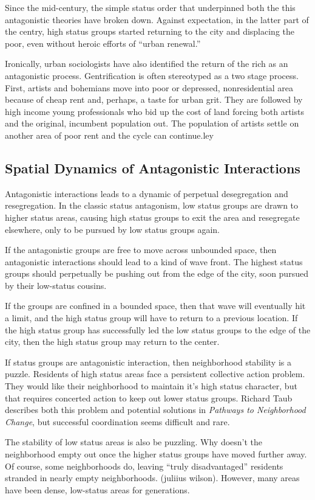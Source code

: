Since the mid-century, the simple status order that underpinned both
the this antagonistic theories have broken down.  Against expectation,
in the latter part of the centry, high status groups started returning
to the city and displacing the poor, even without heroic efforts of
``urban renewal.''

Ironically, urban sociologists have also identified the return of the
rich as an antagonistic process. Gentrification is often stereotyped
as a two stage process. First, artists and bohemians move into poor or
depressed, nonresidential area because of cheap rent and, perhaps, a
taste for urban grit. They are followed by high income young
professionals who bid up the cost of land forcing both artists and the
original, incumbent population out. The population of artists settle
on another area of poor rent and the cycle can continue.{ley}

\subsection*{Spatial Dynamics of Antagonistic Interactions}
Antagonistic interactions leads to a dynamic of perpetual
desegregation and resegregation. In the classic status antagonism, low
status groups are drawn to higher status areas, causing high
status groups to exit the area and resegregate elsewhere, only to be
pursued by low status groups again.

If the antagonistic groups are free to move across unbounded space,
then antagonistic interactions should lead to a kind of wave
front. The highest status groups should perpetually be pushing out
from the edge of the city, soon pursued by their low-status cousins.

If the groups are confined in a bounded space, then that wave will
eventually hit a limit, and the high status group will have to return
to a previous location. If the high status group has successfully led
the low status groups to the edge of the city, then the high status
group may return to the center.

If status groups are antagonistic interaction, then neighborhood
stability is a puzzle. Residents of high status areas face a
persistent collective action problem. They would like their
neighborhood to maintain it's high status character, but that requires
concerted action to keep out lower status groups. Richard Taub
describes both this problem and potential solutions in \emph{Pathways
  to Neighborhood Change}, but successful coordination seems difficult
and rare.

The stability of low status areas is also be puzzling. Why doesn't the
neighborhood empty out once the higher status groups have moved
further away. Of course, some neighborhoods do, leaving ``truly
disadvantaged'' residents stranded in nearly empty
neighborhoods. (juliius wilson). However, many areas have been dense,
low-status areas for generations.
